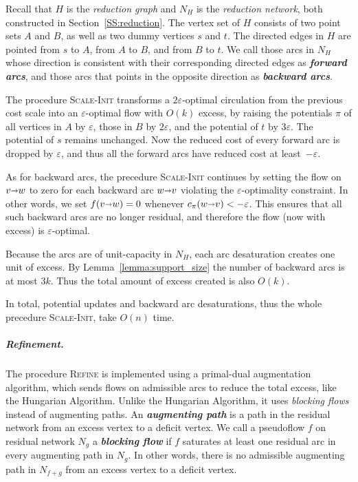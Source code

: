 \documentclass[a4paper,UKenglish]{socg-lipics-v2018}
\def\eps{\varepsilon}
\def\arcto{\mathord\shortrightarrow}
\def\arc#1#2{#1\arcto#2}
\theoremstyle{plain}
\numberwithin{figure}{section}
\renewcommand{\paragraph}{\subparagraph}
\def\EMPH#1{\textbf{\emph{\boldmath #1}}}
\begin{document}
Recall that $H$ is the \emph{reduction graph} and $N_H$ is the \emph{reduction network}, both constructed in Section~\ref{SS:reduction}.  The vertex set of $H$ consists of two point sets $A$ and $B$, as well as two dummy vertices $s$ and $t$.  The directed edges in $H$ are pointed from $s$ to $A$, from $A$ to $B$, and from $B$ to $t$.  We call those arcs in $N_H$ whose direction is consistent with their corresponding directed edges as \EMPH{forward arcs}, and those arcs that points in the opposite direction as \EMPH{backward arcs}.

The procedure \textsc{Scale-Init} transforms a $2\eps$-optimal circulation from the previous cost scale into an $\eps$-optimal flow with $O(k)$ excess, by raising the potentials $\pi$ of all vertices in $A$ by $\eps$, those in $B$ by $2\eps$, and the potential of $t$ by $3\eps$.  The potential of $s$ remains unchanged.
%
Now the reduced cost of every forward arc is dropped by $\eps$, and thus all the forward arcs have reduced cost at least~$-\eps$.

As for backward arcs, the precedure \textsc{Scale-Init} continues by setting the flow on $\arc vw$ to zero for each backward arc $\arc wv$ violating the $\eps$-optimality constraint.  In other words, we set $f(\arc vw) = 0$ whenever $c_\pi(\arc wv) < -\eps$.  This ensures that all such backward arcs are no longer residual, and therefore the flow (now with excess) is $\eps$-optimal.

Because the arcs are of unit-capacity in $N_H$, each arc desaturation creates one unit of excess.
By Lemma~\ref{lemma:support_size} the number of backward arcs is at most $3k$.
Thus the total amount of excess created is also $O(k)$.

In total, potential updates and backward arc desaturations, thus the whole precedure \textsc{Scale-Init}, take $O(n)$ time.


\paragraph{Refinement.}

The procedure \textsc{Refine} is implemented using a primal-dual augmentation algorithm,
which sends flows on admissible arcs to reduce the total excess, like the Hungarian Algorithm.
Unlike the Hungarian Algorithm,
it uses \emph{blocking flows} instead of augmenting paths.
%
An \EMPH{augmenting path} is a path in the residual network from an excess vertex to a deficit vertex.
We call a pseudoflow $f$ on residual network $N_g$ a \EMPH{blocking flow} if $f$ saturates at least one residual arc in every augmenting path in $N_g$.
In other words, there is no admissible augmenting path in $N_{f+g}$ from an excess vertex to a deficit vertex.
\end{document}
